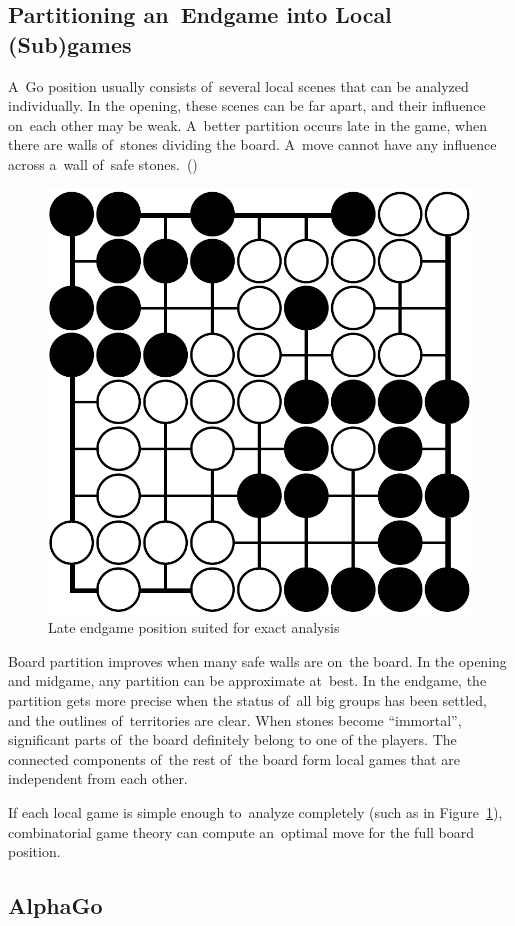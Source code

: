 \subsection{Partitioning an~Endgame into Local (Sub)games}

A~Go position usually consists of~several local scenes that can be analyzed individually.
In the opening, these scenes can be far apart, and their influence on~each other may be weak.
A~better partition occurs late in the game, when there are walls of~stones dividing the board.
A~move cannot have any influence across a~wall of~safe stones.~(\cite{Muller1995computer})

\begin{figure}[H]
  \centering
  \includegraphics[width=.4\textwidth]{../img/late_endgame_Go_position_suited_for_exact_analysis.png}
  \caption{Late endgame position suited for exact analysis}
  \label{fig:late-Go-endgame}
\end{figure}

Board partition improves when many safe walls are on~the board.
In the opening and midgame, any partition can be approximate at~best.
In the endgame, the partition gets more precise when the status of~all big groups has been settled, and the outlines of~territories are clear.
When stones become ``immortal'', significant parts of~the board definitely belong to one of the players.
The connected components of~the rest of~the board form local games that are independent from each other.

If each local game is simple enough to~analyze completely (such as in Figure~\ref{fig:late-Go-endgame}), combinatorial game theory can compute an~optimal move for the full board position.

\subsection{AlphaGo}
\todo
